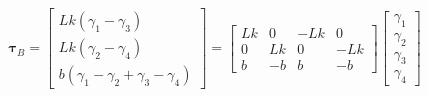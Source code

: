 \[
\boldsymbol\tau_B =
\begin{bmatrix}
Lk \left( \gamma_1 - \gamma_3 \right) \\
Lk \left( \gamma_2 - \gamma_4 \right) \\
b \left( \gamma_1 - \gamma_2 + \gamma_3 - \gamma_4 \right)
\end{bmatrix}
=
\begin{bmatrix}
Lk & 0  & -Lk & 0 \\
0  & Lk & 0   & -Lk \\
b  & -b & b   & -b
\end{bmatrix}
\begin{bmatrix}
\gamma_1 \\ \gamma_2 \\ \gamma_3 \\ \gamma_4
\end{bmatrix}
\]






